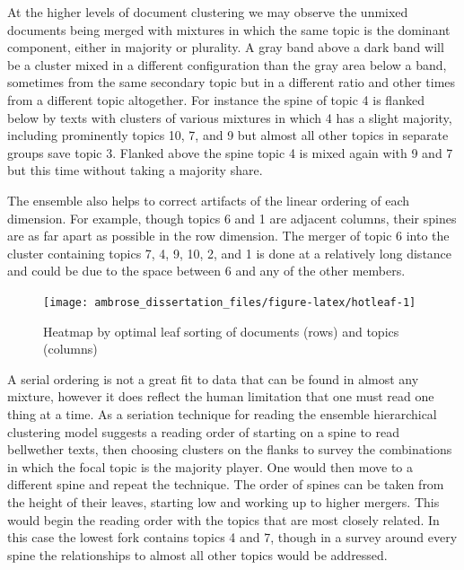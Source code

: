 \documentclass[]{book}
\theoremstyle{definition}
\theoremstyle{definition}
\theoremstyle{definition}
\theoremstyle{remark}
\begin{document}
At the higher levels of document clustering we may observe the unmixed
documents being merged with mixtures in which the same topic is the
dominant component, either in majority or plurality. A gray band above a
dark band will be a cluster mixed in a different configuration than the
gray area below a band, sometimes from the same secondary topic but in a
different ratio and other times from a different topic altogether. For
instance the spine of topic 4 is flanked below by texts with clusters of
various mixtures in which 4 has a slight majority, including prominently
topics 10, 7, and 9 but almost all other topics in separate groups save
topic 3. Flanked above the spine topic 4 is mixed again with 9 and 7 but
this time without taking a majority share.

The ensemble also helps to correct artifacts of the linear ordering of
each dimension. For example, though topics 6 and 1 are adjacent columns,
their spines are as far apart as possible in the row dimension. The
merger of topic 6 into the cluster containing topics 7, 4, 9, 10, 2, and
1 is done at a relatively long distance and could be due to the space
between 6 and any of the other members.

\begin{figure}

{\centering \texttt{[image: ambrose\_dissertation\_files/figure-latex/hotleaf-1]} 

}

\caption{Heatmap by optimal leaf sorting of documents (rows) and topics (columns)}\label{fig:hotleaf}
\end{figure}

A serial ordering is not a great fit to data that can be found in almost
any mixture, however it does reflect the human limitation that one must
read one thing at a time. As a seriation technique for reading the
ensemble hierarchical clustering model suggests a reading order of
starting on a spine to read bellwether texts, then choosing clusters on
the flanks to survey the combinations in which the focal topic is the
majority player. One would then move to a different spine and repeat the
technique. The order of spines can be taken from the height of their
leaves, starting low and working up to higher mergers. This would begin
the reading order with the topics that are most closely related. In this
case the lowest fork contains topics 4 and 7, though in a survey around
every spine the relationships to almost all other topics would be
addressed.
\end{document}

